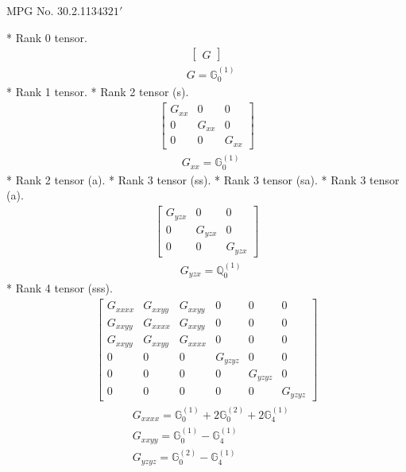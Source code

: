 \documentclass[fleqn,8pt,landscape]{jsarticle}
\begin{document}
\setcounter{MaxMatrixCols}{32}

\renewcommand{\tablename}{Table~}
\renewcommand{\figurename}{Figure~}
\begin{center}
\LARGE
MPG No. 30.2.113\quad$4321'$
\end{center}
* Rank 0 tensor.
\begin{align*}
\begin{bmatrix} G \end{bmatrix}
\end{align*}
\begin{align*}
& G = \mathbb{G}_{0}^{(1)}
\end{align*}
* Rank 1 tensor.
* Rank 2 tensor (s).
\begin{align*}
\begin{bmatrix} G_{xx} & 0 & 0 \\ 0 & G_{xx} & 0 \\ 0 & 0 & G_{xx} \end{bmatrix}
\end{align*}
\begin{align*}
& G_{xx} = \mathbb{G}_{0}^{(1)}
\end{align*}
* Rank 2 tensor (a).
* Rank 3 tensor (ss).
* Rank 3 tensor (sa).
* Rank 3 tensor (a).
\begin{align*}
\begin{bmatrix} G_{yzx} & 0 & 0 \\ 0 & G_{yzx} & 0 \\ 0 & 0 & G_{yzx} \end{bmatrix}
\end{align*}
\begin{align*}
& G_{yzx} = \mathbb{Q}_{0}^{(1)}
\end{align*}
* Rank 4 tensor (sss).
\begin{align*}
\begin{bmatrix} G_{xxxx} & G_{xxyy} & G_{xxyy} & 0 & 0 & 0 \\ G_{xxyy} & G_{xxxx} & G_{xxyy} & 0 & 0 & 0 \\ G_{xxyy} & G_{xxyy} & G_{xxxx} & 0 & 0 & 0 \\ 0 & 0 & 0 & G_{yzyz} & 0 & 0 \\ 0 & 0 & 0 & 0 & G_{yzyz} & 0 \\ 0 & 0 & 0 & 0 & 0 & G_{yzyz} \end{bmatrix}
\end{align*}
\begin{align*}
& G_{xxxx} = \mathbb{G}_{0}^{(1)} + 2 \mathbb{G}_{0}^{(2)} + 2 \mathbb{G}_{4}^{(1)} \\
& G_{xxyy} = \mathbb{G}_{0}^{(1)} - \mathbb{G}_{4}^{(1)} \\
& G_{yzyz} = \mathbb{G}_{0}^{(2)} - \mathbb{G}_{4}^{(1)}
\end{align*}
\end{document}
